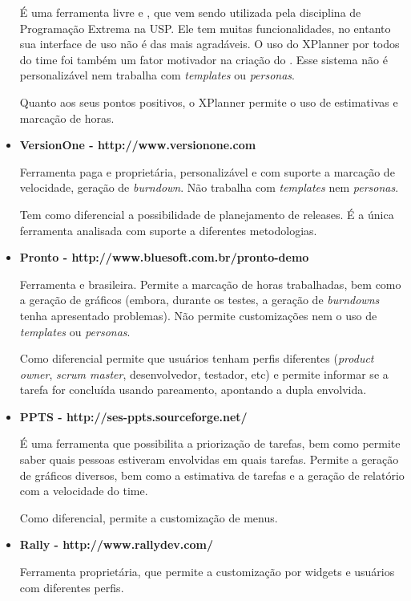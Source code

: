 \begin{itemize}
{É uma ferramenta livre e \opensource{}, que vem sendo utilizada pela disciplina de Programação Extrema na USP. Ele tem muitas funcionalidades, no entanto sua interface de uso não é das mais agradáveis. O uso do XPlanner por todos do time foi também um fator motivador na criação do \calopsita{}. Esse sistema não é personalizável nem trabalha com \textit{templates} ou \textit{personas}.

Quanto aos seus pontos positivos, o XPlanner permite o uso de estimativas e marcação de horas.}

\item{\textbf{VersionOne - http://www.versionone.com}

Ferramenta paga  e proprietária, personalizável e com suporte a marcação de velocidade, geração de \textit{burndown}. Não trabalha com \textit{templates} nem \textit{personas}.

Tem como diferencial a possibilidade de planejamento de releases. É a única ferramenta analisada com suporte a diferentes metodologias.}

\item{\textbf{Pronto - http://www.bluesoft.com.br/pronto-demo}

Ferramenta \opensource{} e brasileira. Permite a marcação de horas trabalhadas, bem como a geração de gráficos (embora, durante os testes, a geração de \textit{burndowns} tenha apresentado problemas). Não permite customizações nem o uso de \textit{templates} ou \textit{personas}. 

Como diferencial permite que usuários tenham perfis diferentes (\textit{product owner}, \textit{scrum master}, desenvolvedor, testador, etc) e permite informar se a tarefa for concluída usando pareamento, apontando a dupla envolvida.}

\item{\textbf{PPTS - http://ses-ppts.sourceforge.net/}

É uma ferramenta \opensource{} que possibilita a priorização de tarefas, bem como permite saber quais pessoas estiveram envolvidas em quais tarefas. Permite a geração de gráficos diversos, bem como a estimativa de tarefas e a geração de relatório com a velocidade do time. 

Como diferencial, permite a customização de menus.}

\item{\textbf{Rally - http://www.rallydev.com/}

Ferramenta proprietária, que permite a customização por widgets e usuários com diferentes perfis. 

}
\end{itemize}
